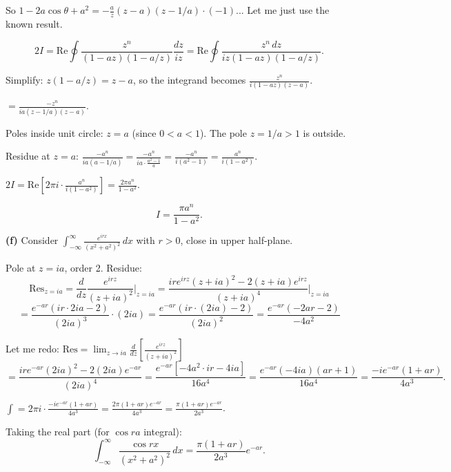 \documentclass[12pt]{article}
\begin{document}
So $1-2a\cos\theta + a^2 = -\frac{a}{z}(z-a)(z-1/a) \cdot (-1)$... Let me just use the known result.

\[
2I = \text{Re}\oint\frac{z^n}{(1-az)(1-a/z)}\frac{dz}{iz} = \text{Re}\oint\frac{z^n\,dz}{iz(1-az)(1-a/z)}.
\]

Simplify: $z(1-a/z) = z - a$, so the integrand becomes $\frac{z^n}{i(1-az)(z-a)}$.

$= \frac{-z^n}{ia(z-1/a)(z-a)}$.

Poles inside unit circle: $z = a$ (since $0<a<1$). The pole $z = 1/a > 1$ is outside.

Residue at $z = a$: $\frac{-a^n}{ia(a-1/a)} = \frac{-a^n}{ia\cdot\frac{a^2-1}{a}} = \frac{-a^n}{i(a^2-1)} = \frac{a^n}{i(1-a^2)}$.

$2I = \text{Re}\left[2\pi i \cdot \frac{a^n}{i(1-a^2)}\right] = \frac{2\pi a^n}{1-a^2}$.

\[
\boxed{I = \frac{\pi a^n}{1-a^2}}.
\]

\textbf{(f)} Consider $\displaystyle\int_{-\infty}^{\infty}\frac{e^{irx}}{(x^2+a^2)^2}\,dx$ with $r > 0$, close in upper half-plane.

Pole at $z = ia$, order 2. Residue:
\[
\text{Res}_{z=ia} = \frac{d}{dz}\frac{e^{irz}}{(z+ia)^2}\bigg|_{z=ia} = \frac{ire^{irz}(z+ia)^2-2(z+ia)e^{irz}}{(z+ia)^4}\bigg|_{z=ia}
\]
\[
= \frac{e^{-ar}(ir\cdot 2ia - 2)}{(2ia)^3} \cdot (2ia) = \frac{e^{-ar}(ir\cdot(2ia)-2)}{(2ia)^2} = \frac{e^{-ar}(-2ar-2)}{-4a^2}
\]

Let me redo: $\text{Res} = \lim_{z\to ia}\frac{d}{dz}\left[\frac{e^{irz}}{(z+ia)^2}\right]$
\[
= \frac{ire^{-ar}(2ia)^2 - 2(2ia)e^{-ar}}{(2ia)^4} = \frac{e^{-ar}[-4a^2\cdot ir - 4ia]}{16a^4} = \frac{e^{-ar}(-4ia)(ar+1)}{16a^4} = \frac{-ie^{-ar}(1+ar)}{4a^3}.
\]

$\int = 2\pi i \cdot \frac{-ie^{-ar}(1+ar)}{4a^3} = \frac{2\pi(1+ar)e^{-ar}}{4a^3} = \frac{\pi(1+ar)e^{-ar}}{2a^3}$.

Taking the real part (for $\cos ra$ integral):
\[
\boxed{\int_{-\infty}^{\infty}\frac{\cos rx}{(x^2+a^2)^2}\,dx = \frac{\pi(1+ar)}{2a^3}e^{-ar}}.
\]
\end{document}
